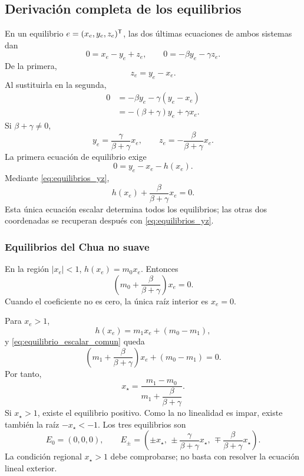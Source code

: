 \fi
\ifnum{}\relax
\subsection{Derivación completa de los equilibrios}
\label{app:equilibrios}

En un equilibrio \(e=(x_e,y_e,z_e)^{\mathsf T}\), las dos últimas ecuaciones de
ambos sistemas dan
\[
0=x_e-y_e+z_e,\qquad
0=-\beta y_e-\gamma z_e.
\]
De la primera,
\[
z_e=y_e-x_e.
\]
Al sustituirla en la segunda,
\begin{align*}
0
&=-\beta y_e-\gamma(y_e-x_e)\\
&=-(\beta+\gamma)y_e+\gamma x_e.
\end{align*}
Si \(\beta+\gamma\neq0\),
\begin{equation}
y_e=\frac{\gamma}{\beta+\gamma}x_e,\qquad
z_e=-\frac{\beta}{\beta+\gamma}x_e.
\label{eq:equilibrios_yz}
\end{equation}
La primera ecuación de equilibrio exige
\[
0=y_e-x_e-h(x_e).
\]
Mediante \cref{eq:equilibrios_yz},
\begin{equation}
h(x_e)+\frac{\beta}{\beta+\gamma}x_e=0.
\label{eq:equilibrio_escalar_comun}
\end{equation}
Esta única ecuación escalar determina todos los equilibrios; las otras dos
coordenadas se recuperan después con \cref{eq:equilibrios_yz}.

\subsubsection{Equilibrios del Chua no suave}

En la región \(|x_e|<1\), \(h(x_e)=m_0x_e\). Entonces
\begin{equation}
\left(m_0+\frac{\beta}{\beta+\gamma}\right)x_e=0.
\label{eq:equilibrio_interior_ns}
\end{equation}
Cuando el coeficiente no es cero, la única raíz interior es \(x_e=0\).

Para \(x_e>1\),
\[
h(x_e)=m_1x_e+(m_0-m_1),
\]
y \cref{eq:equilibrio_escalar_comun} queda
\[
\left(m_1+\frac{\beta}{\beta+\gamma}\right)x_e+(m_0-m_1)=0.
\]
Por tanto,
\begin{equation}
x_\star=
\frac{m_1-m_0}
{m_1+\dfrac{\beta}{\beta+\gamma}}.
\label{eq:raiz_exterior_ns}
\end{equation}
Si \(x_\star>1\), existe el equilibrio positivo. Como la no linealidad es
impar, existe también la raíz \(-x_\star<-1\). Los tres equilibrios son
\begin{equation}
E_0=(0,0,0),\qquad
E_\pm=
\left(
\pm x_\star,\,
\pm\frac{\gamma}{\beta+\gamma}x_\star,\,
\mp\frac{\beta}{\beta+\gamma}x_\star
\right).
\label{eq:equilibrios_ns_simbolicos}
\end{equation}
La condición regional \(x_\star>1\) debe comprobarse; no basta con resolver la
ecuación lineal exterior.

